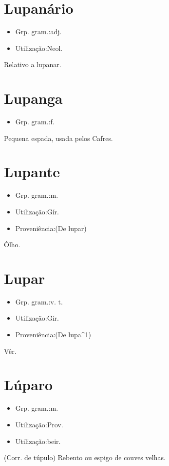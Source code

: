 \section{Lupanário}
\begin{itemize}
\item {Grp. gram.:adj.}
\end{itemize}
\begin{itemize}
\item {Utilização:Neol.}
\end{itemize}
Relativo a lupanar.
\section{Lupanga}
\begin{itemize}
\item {Grp. gram.:f.}
\end{itemize}
Pequena espada, usada pelos Cafres.
\section{Lupante}
\begin{itemize}
\item {Grp. gram.:m.}
\end{itemize}
\begin{itemize}
\item {Utilização:Gír.}
\end{itemize}
\begin{itemize}
\item {Proveniência:(De \textunderscore lupar\textunderscore )}
\end{itemize}
Ôlho.
\section{Lupar}
\begin{itemize}
\item {Grp. gram.:v. t.}
\end{itemize}
\begin{itemize}
\item {Utilização:Gír.}
\end{itemize}
\begin{itemize}
\item {Proveniência:(De \textunderscore lupa\textunderscore ^1)}
\end{itemize}
Vêr.
\section{Lúparo}
\begin{itemize}
\item {Grp. gram.:m.}
\end{itemize}
\begin{itemize}
\item {Utilização:Prov.}
\end{itemize}
\begin{itemize}
\item {Utilização:beir.}
\end{itemize}
(Corr. de \textunderscore túpulo\textunderscore )
Rebento ou espigo de couves velhas.
